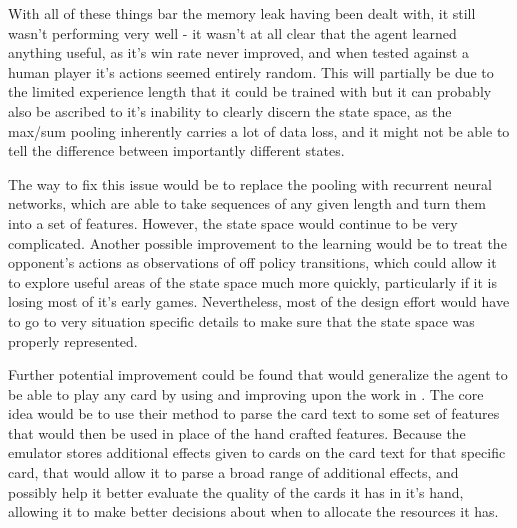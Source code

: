 With all of these things bar the memory leak having been dealt with, it still wasn't performing very well - it wasn't at all clear that the agent learned anything useful, as it's win rate never improved, and when tested against a human player it's actions seemed entirely random. This will partially be due to the limited experience length that it could be trained with but it can probably also be ascribed to it's inability to clearly discern the state space, as the max/sum pooling inherently carries a lot of data loss, and it might not be able to tell the difference between importantly different states.

The way to fix this issue would be to replace the pooling with recurrent neural networks, which are able to take sequences of any given length and turn them into a set of features. However, the state space would continue to be very complicated. Another possible improvement to the learning would be to treat the opponent's actions as observations of off policy transitions, which could allow it to explore useful areas of the state space much more quickly, particularly if it is losing most of it's early games. Nevertheless, most of the design effort would have to go to very situation specific details to make sure that the state space was properly represented.

Further potential improvement could be found that would generalize the agent to be able to play any card by using and improving upon the work in \cite{deepmind:mtg}. The core idea would be to use their method to parse the card text to some set of features that would then be used in place of the hand crafted features. Because the emulator stores additional effects given to cards on the card text for that specific card, that would allow it to parse a broad range of additional effects, and possibly help it better evaluate the quality of the cards it has in it's hand, allowing it to make better decisions about when to allocate the resources it has.